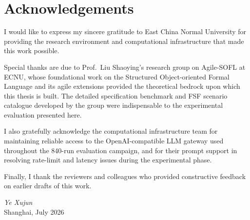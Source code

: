 \chapter*{Acknowledgements}

I would like to express my sincere gratitude to East China Normal University for providing
the research environment and computational infrastructure that made this work possible.

Special thanks are due to Prof.\ Liu Shaoying's research group on Agile-SOFL at ECNU,
whose foundational work on the Structured Object-oriented Formal Language and its agile
extensions provided the theoretical bedrock upon which this thesis is built.  The detailed
specification benchmark and FSF scenario catalogue developed by the group were indispensable
to the experimental evaluation presented here.

I also gratefully acknowledge the computational infrastructure team for maintaining reliable
access to the OpenAI-compatible LLM gateway used throughout the 840-run evaluation campaign, and for their
prompt support in resolving rate-limit and latency issues during the experimental phase.

Finally, I thank the reviewers and colleagues who provided constructive feedback on earlier
drafts of this work.

\bigskip
\noindent\textit{Ye Xujun}\\
Shanghai, July 2026
